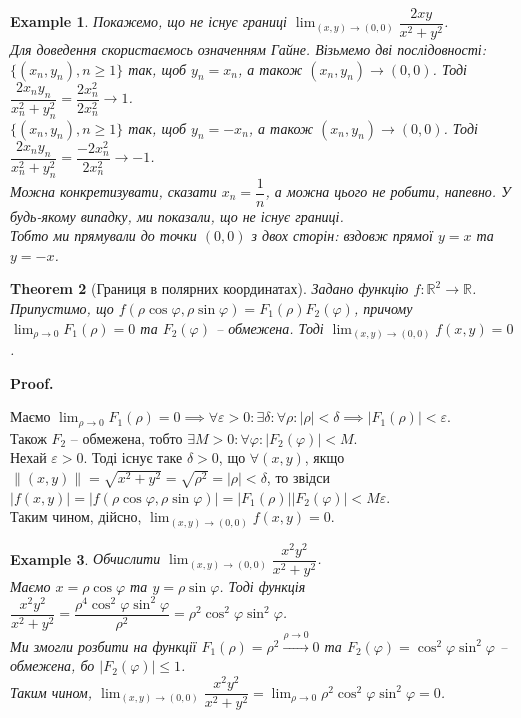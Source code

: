 \documentclass[a4paper, 10pt]{article}
\makeatletter
\def\huge{\displaystyle}
\def\qed{$\blacksquare$}
\theoremstyle{theoremdd}
\newtheorem{theorem}{Theorem}[subsection]
\theoremstyle{theoremdd}
\theoremstyle{theoremdd}
\theoremstyle{theoremdd}
\theoremstyle{theoremdd}
\newtheorem{example}[theorem]{Example}
\theoremstyle{theoremdd}
\theoremstyle{theoremdd}
\theoremstyle{theoremdd}
\theoremstyle{theoremdd}
\renewenvironment{proof}[1][Proof.\\]{\par
\pushQED{\hfill \qed}%
\normalfont \topsep6\p@\@plus6\p@\relax
\trivlist
\item\relax
{\bfseries
#1\@addpunct{.}}\hspace\labelsep\ignorespaces
}{%
\popQED\endtrivlist\@endpefalse
}
\newcommand\Norm[1]{\|#1\|}
\makeatother
\begin{document}
\begin{example}
Покажемо, що не існує границі $\displaystyle\lim_{(x,y) \to (0,0)} \dfrac{2xy}{x^2+y^2}$.\\
Для доведення скористаємось означенням Гайне. Візьмемо дві послідовності:\\
$\{(x_n,y_n), n \geq 1\}$ так, щоб $y_n = x_n$, а також $(x_n,y_n) \to (0,0)$. Тоді $\dfrac{2x_n y_n}{x_n^2+y_n^2} = \dfrac{2x_n^2}{2x_n^2} \to 1$.\\
$\{(x_n,y_n), n \geq 1\}$ так, щоб $y_n = -x_n$, а також $(x_n,y_n) \to (0,0)$. Тоді $\dfrac{2x_n y_n}{x_n^2+y_n^2} = \dfrac{-2x_n^2}{2x_n^2} \to -1$.\\
Можна конкретизувати, сказати $x_n = \dfrac{1}{n}$, а можна цього не робити, напевно. У будь-якому випадку, ми показали, що не існує границі.\\
Тобто ми прямували до точки $(0,0)$ з двох сторін: вздовж прямої $y = x$ та $y = -x$.
\end{example}

\begin{theorem}[Границя в полярних координатах]
Задано функцію $f \colon \mathbb{R}^2 \to \mathbb{R}$. Припустимо, що $f(\rho \cos \varphi, \rho \sin \varphi) = F_1(\rho) F_2(\varphi)$, причому $\huge\lim_{\rho \to 0} F_1(\rho) = 0$ та $F_2(\varphi)$ -- обмежена. Тоді $\huge\lim_{(x,y) \to (0,0)} f(x,y) = 0$.
\end{theorem}

\begin{proof}
Маємо $\huge\lim_{\rho \to 0} F_1(\rho) = 0 \implies \forall \varepsilon > 0: \exists \delta: \forall \rho: |\rho| < \delta \implies |F_1(\rho)| < \varepsilon$.\\
Також $F_2$ -- обмежена, тобто $\exists M>0: \forall \varphi: |F_2(\varphi)| < M$.\\
Нехай $\varepsilon > 0$. Тоді існує таке $\delta > 0$, що $\forall (x,y)$, якщо $\Norm{(x,y)} = \sqrt{x^2+y^2} = \sqrt{\rho^2} = |\rho| < \delta$, то звідси $|f(x,y)| = |f(\rho \cos \varphi, \rho \sin \varphi)| = |F_1(\rho)| |F_2(\varphi)| < M\varepsilon$.\\
Таким чином, дійсно, $\huge\lim_{(x,y) \to (0,0)} f(x,y) = 0$.
\end{proof}

\begin{example}
Обчислити $\huge\lim_{(x,y) \to (0,0)} \dfrac{x^2y^2}{x^2+y^2}$.\\
Маємо $x = \rho \cos \varphi$ та $y = \rho \sin \varphi$. Тоді функція $\dfrac{x^2y^2}{x^2+y^2} = \dfrac{\rho^4 \cos^2 \varphi \sin^2 \varphi}{\rho^2} = \rho^2 \cos^2 \varphi \sin^2 \varphi$.\\
Ми змогли розбити на функції $F_1(\rho) = \rho^2 \overset{\rho \to 0}{\longrightarrow} 0$ та $F_2(\varphi) = \cos^2 \varphi \sin^2 \varphi$ -- обмежена, бо $|F_2(\varphi)| \leq 1$.\\
Таким чином, $\huge\lim_{(x,y) \to (0,0)} \dfrac{x^2y^2}{x^2+y^2} = \lim_{\rho \to 0} \rho^2 \cos^2 \varphi \sin^2 \varphi = 0$.
\end{example}
\end{document}
